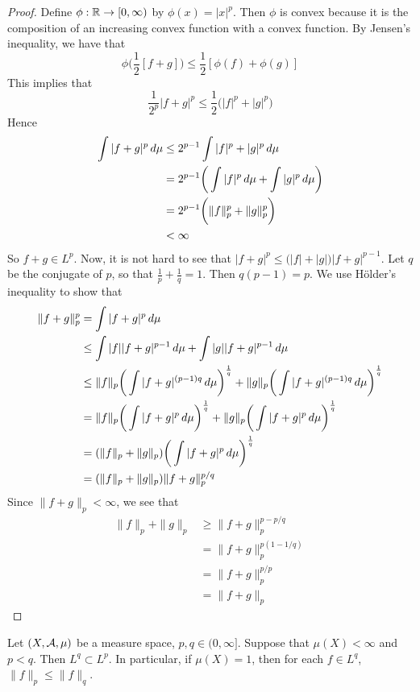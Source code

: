 \documentclass{book}
\begin{document}
	\begin{proof}
		Define $\phi:\mathbb{R} \rightarrow [0,\infty)$ by $\phi(x) = | x |^p$. Then $\phi$ is convex because it is the composition of an increasing convex function with a convex function. By Jensen's inequality, we have that $$\phi\bigg(\frac{1}{2}[f+g] \bigg) \leq \frac{1}{2}[\phi(f)+\phi(g)]$$ 
		This implies that $$\frac{1}{2^p} | f+g|^p \leq \frac{1}{2}\bigg(| f|^p +| g |^p\bigg)$$ 
		Hence 
		\begin{align*}
			\int| f + g|^p \, d \mu 
			& \leq 2^{p-1}\int | f|^p +| g|^p \, d \mu \\
			& = 2^{p-1}\bigg(\int | f|^p \, d \mu + \int | g|^p \, d \mu \bigg) \\
			&= 2^{p-1}\bigg( \|f \|_p^p + \|g \|_p^p\bigg) \\
			& < \infty
		\end{align*}
		So $f+g \in L^p$. Now, it is not hard to see that $|f+g|^p \leq \big( |f| + |g| \big)|f+g|^{p-1}$. Let $q$ be the conjugate of $p$, so that $\frac{1}{p} + \frac{1}{q} = 1$. Then $q(p-1) = p$. We use Hölder's inequality to show that 
		\begin{align*}
			\|f+g \|_p ^p
			&= \int  |f+g|^p \, d \mu \\
			& \leq \int |f| |f+g|^{p-1} \, d \mu + \int |g| |f+g|^{p-1} \, d \mu \\
			& \leq \|f\|_p \bigg(\int |f+g|^{(p-1)q} \, d \mu\bigg)^{\frac{1}{q}} + \|g\|_p \bigg(\int |f+g|^{(p-1)q}\, d \mu\bigg)^{\frac{1}{q}} \\
			&= \|f\|_p \bigg(\int |f+g|^{p} \, d \mu\bigg)^{\frac{1}{q}} + \|g\|_p \bigg(\int |f+g|^{p}\, d \mu\bigg)^{\frac{1}{q}} \\ 
			&= (\|f\|_p + \|g \|_p) \bigg(\int |f+g|^{p} \, d \mu\bigg)^{\frac{1}{q}}\\
			&= (\|f \|_p + \|g \|_p) \|f+g \|_p^{p/q}
		\end{align*}
		Since $\|f+g \|_p < \infty$, we see that
		\begin{align*}
			\|f \|_p + \|g \|_p 
			& \geq \|f+g \|_p ^{p - p/q} \\
			&=  \|f+g \|_p ^{p(1 - 1/q)} \\
			&= \|f+g \|_p ^{p/p} \\
			&= \|f+g \|_p
		\end{align*}
	\end{proof}
	
	\begin{ex}  
		Let $(X, \mathcal{A}, \mu)$ be a measure space, $p,q \in (0, \infty]$. Suppose that $\mu(X) < \infty$ and $p < q$. Then $L^q \subset L^p$. In particular, if $\mu(X) = 1$, then for each $f \in L^q$, $\|f\|_p \leq \|f\|_q$.
	\end{ex}
	
\end{document}
